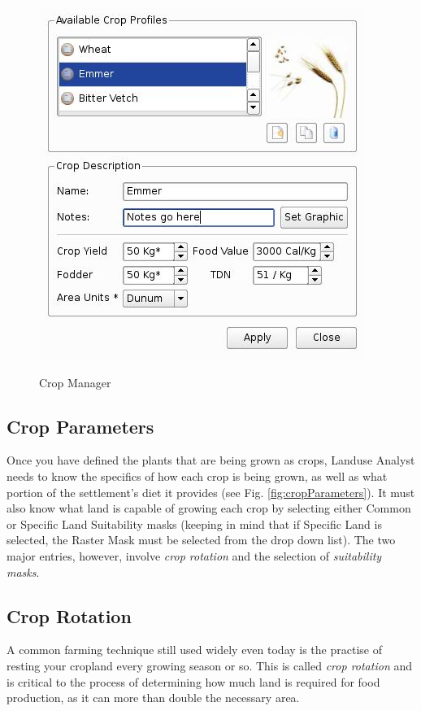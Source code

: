       \begin{figure}[htbp]
        \includegraphics[scale=.6]{./images/cropManager.jpg}
      \label{fig:cropManager} \caption{Crop Manager}
    \end{figure}

  \subsection{Crop Parameters}
  \label{cropParameters}
  Once you have defined the plants that are being grown as crops, Landuse
Analyst needs to know the specifics of how each crop is being grown, as well as
what portion of the settlement's diet it provides (see Fig.
\ref{fig:cropParameters}).  It must also
know what land is capable of growing each crop by selecting either Common or
Specific Land Suitability masks (keeping in mind that if Specific Land is
selected, the Raster Mask must be selected from the drop down list).  The two
major entries, however, involve \textit{crop rotation} and the selection of
\textit{suitability masks}.

    \subsection{Crop Rotation}
    \label{cropRotation}
    A common farming technique still used widely even today is the practise of
resting your cropland every growing season or so.  This is called \textit{crop
rotation} and is critical to the process of determining how much land is
required for food production, as it can more than double the necessary area. 

